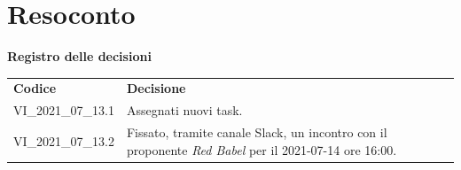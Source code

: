 \documentclass[a4paper]{article}
\begin{document}
\section{Resoconto}
\begin{center}
    \textbf{\Large Registro delle decisioni}\\
    \vspace{10px}
    \begin{table}[h!]
        \centering
        \renewcommand{\arraystretch}{1.8}
        \begin{tabular}{p{200px} p{200px}}
            \rowcolor{logo!70} \textbf{Codice} & \textbf{Decisione}                                                                                           \\
            VI\_2021\_07\_13.1                 & Assegnati nuovi task.                                                                                        \\
            VI\_2021\_07\_13.2                 & Fissato, tramite canale Slack, un incontro con il proponente \textit{Red Babel} per il 2021-07-14 ore 16:00. \\
        \end{tabular}
    \end{table}
\end{center}
\end{document}
